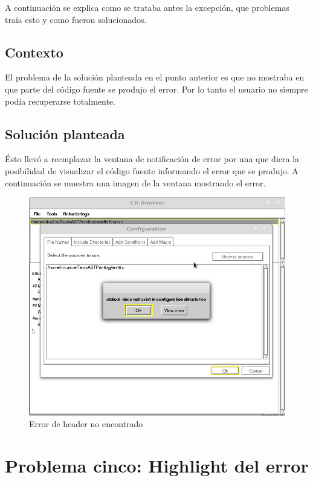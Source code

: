 \documentclass[a4paper,oneside,10pt]{article}
\begin{document}
A continuaci\'on se explica como se trataba antes la excepci\'on, que problemas tra\'ia esto y como fueron solucionados.

\subsection{Contexto}
El problema de la soluci\'on planteada en el punto anterior es que no mostraba en que parte del c\'odigo fuente se produjo el error. Por lo tanto el usuario no siempre pod\'ia recuperarse totalmente.

\subsection{Soluci\'on planteada}
\'Esto llev\'o a reemplazar la ventana de notificaci\'on de error por una que diera la posibilidad de visualizar el c\'odigo fuente informando el error que se produjo. A continuación se muestra una imagen de la ventana mostrando el error.

\begin{figure}[h!]
  \centering
    \includegraphics[scale=0.50]{images/codigo_modificado/error_header_no_encontrado.jpg}
     \caption{Error de header no encontrado}
\end{figure}

\section{Problema cinco: Highlight del error}
\end{document}
